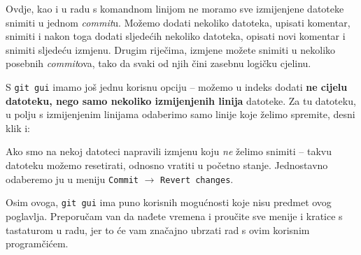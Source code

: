 Ovdje, kao i u radu s komandnom linijom ne moramo sve izmijenjene datoteke snimiti u jednom \emph{commit}u. 
Možemo dodati nekoliko datoteka, upisati komentar, snimiti i nakon toga dodati sljedećih nekoliko datoteka, opisati novi komentar i snimiti sljedeću izmjenu.
Drugim riječima, izmjene možete snimiti u nekoliko posebnih \emph{commit}ova, tako da svaki od njih čini zasebnu logičku cjelinu.

S \verb+git gui+ imamo još jednu korisnu opciju -- možemo u indeks dodati \textbf{ne cijelu datoteku, nego samo nekoliko izmijenjenih linija} datoteke.
Za tu datoteku, u polju s izmijenjenim linijama odaberimo samo linije koje želimo spremite, desni klik i:


Ako smo na nekoj datoteci napravili izmjenu koju \emph{ne} želimo snimiti -- takvu datoteku možemo resetirati, odnosno vratiti u početno stanje. 
Jednostavno odaberemo ju u meniju \verb+Commit+ $\rightarrow$ \verb+Revert changes+.

Osim ovoga, \verb+git gui+ ima puno korisnih mogućnosti koje nisu predmet ovog poglavlja.
Preporučam van da nađete vremena i proučite sve menije i kratice s tastaturom u radu, jer to će vam značajno ubrzati rad s ovim korisnim programčićem.



